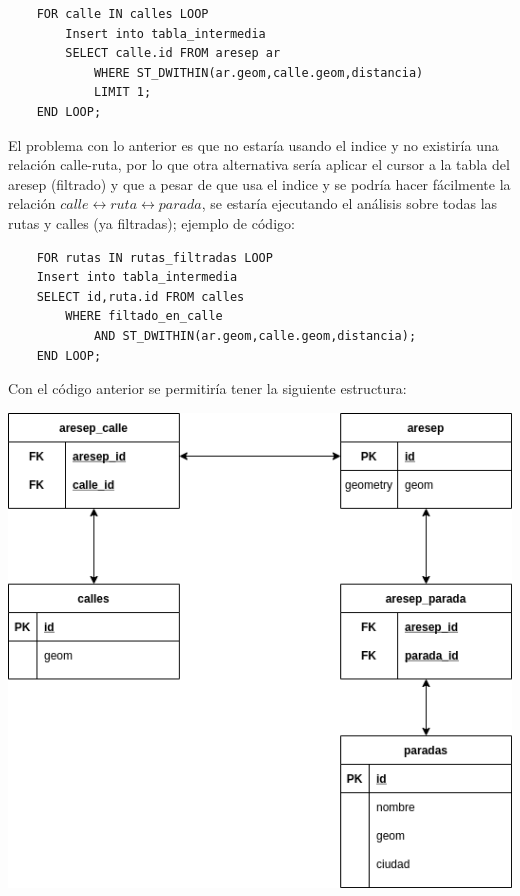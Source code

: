 \begin{lstlisting}
	FOR calle IN calles LOOP
		Insert into tabla_intermedia
		SELECT calle.id FROM aresep ar
			WHERE ST_DWITHIN(ar.geom,calle.geom,distancia)
			LIMIT 1;
	END LOOP;
\end{lstlisting}

El problema con lo anterior es que no estaría usando el indice y no existiría una relación calle-ruta, por lo que otra alternativa sería aplicar el cursor a la tabla del aresep (filtrado) y que a pesar de que usa el indice y se podría hacer fácilmente la relación $calle\longleftrightarrow ruta\longleftrightarrow parada$, se estaría ejecutando el análisis sobre todas las rutas y calles (ya filtradas); ejemplo de código:

\begin{lstlisting}
	FOR rutas IN rutas_filtradas LOOP
	Insert into tabla_intermedia
	SELECT id,ruta.id FROM calles
		WHERE filtado_en_calle
			AND ST_DWITHIN(ar.geom,calle.geom,distancia);
	END LOOP;
\end{lstlisting}

\hfill

Con el código anterior se permitiría tener la siguiente estructura:

\begin{center}
	\includegraphics[scale=.65]{imagenes/diagram_db.png}
\end{center}

